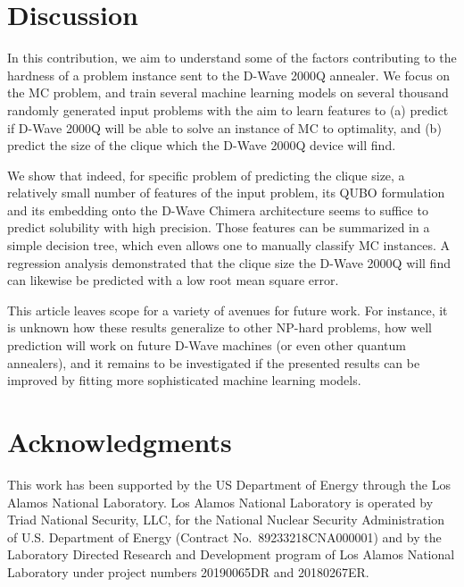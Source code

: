 \documentclass[a4paper,11pt]{article}
\begin{document}
\section{Discussion}
\label{sec:discussion}
In this contribution, we aim to understand some of the factors contributing to the hardness of a problem instance sent to the D-Wave 2000Q annealer. We focus on the MC problem, and train several machine learning models on several thousand randomly generated input problems with the aim to learn features to (a) predict if D-Wave 2000Q will be able to solve an instance of MC to optimality, and (b) predict the size of the clique which the D-Wave 2000Q device will find.

We show that indeed, for specific problem of predicting the clique size, a relatively small number of features of the input problem, its QUBO formulation and its embedding onto the D-Wave Chimera architecture seems to suffice to predict solubility with high precision. Those features can be summarized in a simple decision tree, which even allows one to manually classify MC instances. A regression analysis demonstrated that the clique size the D-Wave 2000Q will find can likewise be predicted with a low root mean square error.

This article leaves scope for a variety of avenues for future work. For instance, it is unknown how these results generalize to other NP-hard problems, how well prediction will work on future D-Wave machines (or even other quantum annealers), and it remains to be investigated if the presented results can be improved by fitting more sophisticated machine learning models.



\section*{Acknowledgments}
This work has been supported by the US Department of Energy through the Los Alamos National Laboratory. Los Alamos National Laboratory is operated by Triad National Security, LLC, for the National Nuclear Security Administration of U.S. Department of Energy (Contract No.~89233218CNA000001) and by the Laboratory Directed Research and Development program of Los Alamos National Laboratory under project numbers 20190065DR and 20180267ER.
\end{document}
